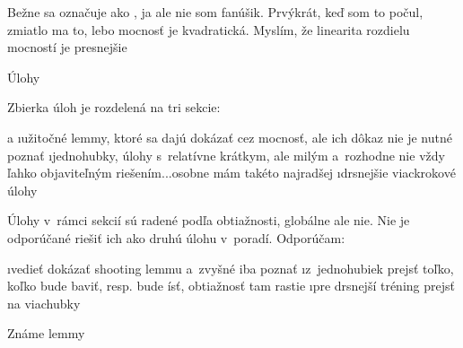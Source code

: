 Bežne sa označuje ako , ja ale nie som fanúšik. Prvýkrát, keď som to počul, zmiatlo ma to, lebo mocnosť je kvadratická. Myslím, že linearita rozdielu mocností je presnejšie \Laugh{}

\sec Úlohy

Zbierka úloh je rozdelená na tri sekcie:

\begitems \style a
\i užitočné lemmy, ktoré sa dajú dokázať cez mocnosť, ale ich dôkaz nie je nutné poznať
\i jednohubky, úlohy s~relatívne krátkym, ale milým a~rozhodne nie vždy ľahko objaviteľným riešením...osobne mám takéto najradšej
\i drsnejšie viackrokové úlohy
\enditems

Úlohy v~rámci sekcií sú radené podľa obtiažnosti, globálne ale nie. Nie je odporúčané riešiť ich ako druhú úlohu v~poradí. Odporúčam:

\begitems
\i vedieť dokázať shooting lemmu a~zvyšné iba poznať
\i z~jednohubiek prejsť toľko, koľko bude baviť, resp. bude ísť, obtiažnosť tam rastie
\i pre drsnejší tréning prejsť na viachubky
\enditems

\secc Známe lemmy

